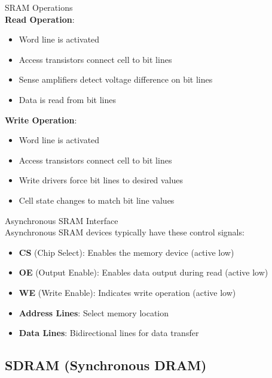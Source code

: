 \begin{definition}{SRAM Operations}\\
\textbf{Read Operation}:
\begin{itemize}
    \item Word line is activated
    \item Access transistors connect cell to bit lines
    \item Sense amplifiers detect voltage difference on bit lines
    \item Data is read from bit lines
\end{itemize}
\textbf{Write Operation}:
\begin{itemize}
    \item Word line is activated
    \item Access transistors connect cell to bit lines
    \item Write drivers force bit lines to desired values
    \item Cell state changes to match bit line values
\end{itemize}
\end{definition}

\begin{definition}{Asynchronous SRAM Interface}\\
Asynchronous SRAM devices typically have these control signals:
\begin{itemize}
    \item \textbf{CS} (Chip Select): Enables the memory device (active low)
    \item \textbf{OE} (Output Enable): Enables data output during read (active low)
    \item \textbf{WE} (Write Enable): Indicates write operation (active low)
    \item \textbf{Address Lines}: Select memory location
    \item \textbf{Data Lines}: Bidirectional lines for data transfer
\end{itemize}
\end{definition}

\multend

\subsection{SDRAM (Synchronous DRAM)}


